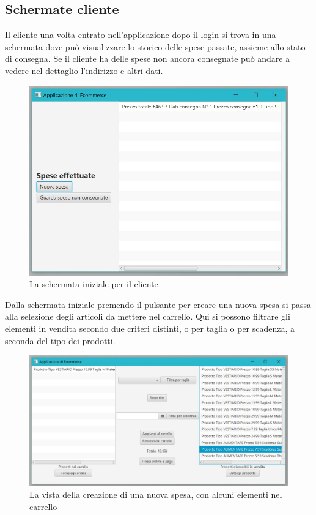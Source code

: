 \documentclass[a4paper,12pt]{report}
\begin{document}
\subsection*{Schermate cliente}
Il cliente una volta entrato nell'applicazione dopo il login si trova in una schermata dove può visualizzare lo 
storico delle spese passate, assieme allo stato di consegna. Se il cliente ha delle spese non ancora consegnate può andare a vedere nel dettaglio l'indirizzo e altri dati.
\begin{figure}[H]
	\centering{}
	\includegraphics[width=\textwidth]{img/Application/ClientMenu1.jpg}
	\caption{La schermata iniziale per il cliente}
\end{figure}
Dalla schermata iniziale premendo il pulsante per creare una nuova spesa si passa alla selezione degli articoli da mettere nel carrello. 
Qui si possono filtrare gli elementi in vendita secondo due criteri distinti, o per taglia o per scadenza, a seconda del tipo dei prodotti.
\begin{figure}[H]
	\centering{}
	\includegraphics[width=\textwidth]{img/Application/ClientMenu2.jpg}
	\caption{La vista della creazione di una nuova spesa, con alcuni elementi nel carrello}
\end{figure}
\end{document}

